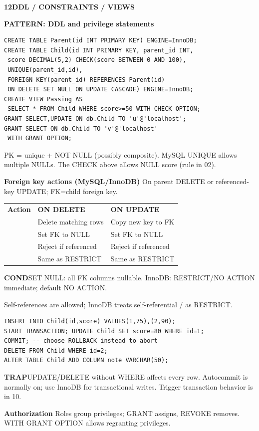 \documentclass[a4paper]{article}
\newcommand{\sqlfont}{\ttfamily}
\newcommand{\bodyfontsize}{5.55}
\newcommand{\bodyleading}{5.3}
\newlength{\gutter}\setlength{\gutter}{1.5mm}
\newcommand{\bodylineskiplimit}{-2pt}
\newcommand{\bodystyle}{%
  \fontsize{\bodyfontsize}{\bodyleading}\selectfont\setlength{\lineskiplimit}{\bodylineskiplimit}\RaggedRight
  \setlength{\abovedisplayskip}{.5pt}\setlength{\belowdisplayskip}{.5pt}%
  \setlength{\abovedisplayshortskip}{.3pt}\setlength{\belowdisplayshortskip}{.3pt}}
\newcommand{\topic}[2]{\par\addvspace{.45pt}\nointerlineskip%
  \begingroup\setlength{\fboxsep}{0.35pt}%
  \noindent\colorbox{structure}{\parbox{\dimexpr\linewidth-2\fboxsep\relax}{%
    \color{white}\fontsize{6.45}{6.8}\selectfont\bfseries #1\enspace #2}}%
  \endgroup\par\nobreak\vspace{.55pt}\nointerlineskip\nobreak}
\newenvironment{topicblock}
  {\par\bodystyle}
  {\par}
\newcommand{\key}[1]{\par\textcolor{structure}{\textbf{#1}}\enspace}
\newcommand{\note}[4]{\par\nointerlineskip\vspace{.25pt}\begingroup\setlength{\fboxsep}{0.1pt}%
  \noindent\colorbox{#1}{\parbox{\dimexpr\linewidth-2\fboxsep\relax}{%
    \RaggedRight\textcolor{#2}{\textbf{#3}}\enspace #4}}%
  \endgroup\par\nointerlineskip\vspace{.25pt}}
\newcommand{\cond}[1]{\note{conditionbg}{condition}{COND}{#1}}
\newcommand{\trap}[1]{\note{warningbg}{warning}{TRAP}{#1}}
\newcommand{\pattern}[1]{\key{PATTERN: #1}}
\newcommand{\sql}[1]{{\sqlfont\color{sqltext}\detokenize{#1}}}
\newlength{\sheetwidth}
\newenvironment{sheetcolumns}[1]
  {\noindent\begin{minipage}[t]{#1\sheetwidth}\vspace{0pt}\bodystyle\ignorespaces}
  {\end{minipage}\par}
\newcommand{\nextcol}[1]{\end{minipage}\hspace{\gutter}%
  \begin{minipage}[t]{#1\sheetwidth}\vspace{0pt}\bodystyle\ignorespaces}
\begin{document}
\begin{sheetcolumns}{.254}
\nextcol{.272}
\begin{topicblock}
\topic{12}{DDL / CONSTRAINTS / VIEWS}
\pattern{DDL and privilege statements}
\begin{lstlisting}
CREATE TABLE Parent(id INT PRIMARY KEY) ENGINE=InnoDB;
CREATE TABLE Child(id INT PRIMARY KEY, parent_id INT,
 score DECIMAL(5,2) CHECK(score BETWEEN 0 AND 100),
 UNIQUE(parent_id,id),
 FOREIGN KEY(parent_id) REFERENCES Parent(id)
 ON DELETE SET NULL ON UPDATE CASCADE) ENGINE=InnoDB;
CREATE VIEW Passing AS
 SELECT * FROM Child WHERE score>=50 WITH CHECK OPTION;
GRANT SELECT,UPDATE ON db.Child TO 'u'@'localhost';
GRANT SELECT ON db.Child TO 'v'@'localhost'
 WITH GRANT OPTION;
\end{lstlisting}
PK = unique + NOT NULL (possibly composite). MySQL UNIQUE allows multiple NULLs. The CHECK above allows NULL score (rule in 02).
\key{Foreign key actions (MySQL/InnoDB)}
On parent DELETE or referenced-key UPDATE; FK=child foreign key.
\par\begingroup\setlength{\tabcolsep}{1.4pt}
\begin{tabular}{@{}lll@{}}
\textbf{Action} & \textbf{ON DELETE} & \textbf{ON UPDATE}\\
\sql{CASCADE} & Delete matching rows & Copy new key to FK\\
\sql{SET NULL} & Set FK to NULL & Set FK to NULL\\
\sql{RESTRICT} & Reject if referenced & Reject if referenced\\
\sql{NO ACTION} & Same as RESTRICT & Same as RESTRICT
\end{tabular}\endgroup\par
\cond{SET NULL: all FK columns nullable. InnoDB: RESTRICT/NO ACTION immediate; default NO ACTION.}
Self-references are allowed; InnoDB treats self-referential \sql{ON UPDATE CASCADE} / \sql{ON UPDATE SET NULL} as RESTRICT.
\begin{lstlisting}
INSERT INTO Child(id,score) VALUES(1,75),(2,90);
START TRANSACTION; UPDATE Child SET score=80 WHERE id=1;
COMMIT; -- choose ROLLBACK instead to abort
DELETE FROM Child WHERE id=2;
ALTER TABLE Child ADD COLUMN note VARCHAR(50);
\end{lstlisting}
\trap{UPDATE/DELETE without WHERE affects every row. Autocommit is normally on; use InnoDB for transactional writes. Trigger transaction behavior is in 10.}
\key{Authorization}
Roles group privileges; GRANT assigns, REVOKE removes. WITH GRANT OPTION allows regranting privileges.

\end{topicblock}
\end{sheetcolumns}
\end{document}
